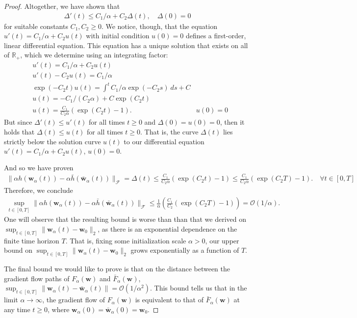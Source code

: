 \documentclass{article}
\begin{document}
\begin{proof}
Altogether, we have shown that
\begin{align*}
    \Delta'(t) \leq C_1/\alpha + C_2\Delta(t), \quad \Delta(0) = 0
\end{align*}
for suitable constants $C_1, C_2 \geq 0$. We notice, though, that the equation $u'(t) = C_1/\alpha + C_2 u(t)$ with initial condition $u(0) = 0$ defines a first-order, linear differential equation. This equation has a unique solution that exists on all of $\mathbb{R}_+$, which we determine using an integrating factor:
\begin{align*}
    &u'(t) = C_1/\alpha + C_2 u(t)\\
    &u'(t) - C_2u(t) = C_1/\alpha\\
    & \exp(-C_2t)u(t) = \int^t C_1/\alpha  \exp(-C_2s) \ ds + C\\
    & u(t) = -C_1/(C_2\alpha) + C\exp(C_2t)\\
    & u(t) = \frac{C_1}{C_2\alpha}(\exp(C_2t) - 1). & u(0) = 0
\end{align*}
But since $\Delta'(t) \leq u'(t)$ for all times $t \geq 0$ and $\Delta(0) = u(0) = 0$, then it holds that $\Delta(t) \leq u(t)$ for all times $t \geq 0$. That is, the curve $\Delta(t)$ lies strictly below the solution curve $u(t)$ to our differential equation $u'(t) = C_1/\alpha + C_2 u(t)$, $u(0) = 0$.

And so we have proven
\begin{align*}
    \| \alpha h(\boldsymbol{w}_{\alpha}(t)) - \alpha \bar{h}(\boldsymbol{\bar{w}}_{\alpha}(t)) \|_{\mathcal{F}} =  \Delta(t) \leq \frac{C_1}{C_2\alpha}(\exp(C_2t) - 1) \leq \frac{C_1}{C_2\alpha}(\exp(C_2T) - 1). \quad \forall t \in [0, T]
\end{align*}
Therefore, we conclude
\begin{align*}
   \sup_{t \in [0, T]} \| \alpha h(\boldsymbol{w}_{\alpha}(t)) - \alpha \bar{h}(\boldsymbol{\bar{w}}_{\alpha}(t)) \|_{\mathcal{F}} \leq \frac{1}{\alpha} \left( \frac{C_1}{C_2}(\exp(C_2T) - 1) \right) = \mathcal{O}(1/\alpha).
\end{align*}
One will observe that the resulting bound is worse than than that we derived on $\sup_{t \in [0, T]} \| \boldsymbol{w}_{\alpha}(t) - \boldsymbol{w}_0 \|_2$, as there is an exponential dependence on the finite time horizon $T$. That is, fixing some initialization scale $\alpha > 0$, our upper bound on $\sup_{t \in [0, T]} \| \boldsymbol{w}_{\alpha}(t) - \boldsymbol{w}_0 \|_2$ grows exponentially as a function of $T$.

The final bound we would like to prove is that on the distance between the gradient flow paths of $F_{\alpha}(\boldsymbol{w})$ and $\bar{F}_{\alpha}(\boldsymbol{w})$, $\sup_{t \in [0, T]} \| \boldsymbol{w}_{\alpha}(t) -  \boldsymbol{\bar{w}}_{\alpha}(t) \| = \mathcal{O}(1/\alpha^2)$. This bound tells us that in the limit $\alpha \rightarrow \infty$, the gradient flow of $F_{\alpha}(\boldsymbol{w})$ is equivalent to that of $\bar{F}_{\alpha}(\boldsymbol{w})$ at any time $t \geq 0$, where $\boldsymbol{w}_{\alpha}(0) = \boldsymbol{\bar{w}}_{\alpha}(0) = \boldsymbol{w}_0$. 


\end{proof}
\end{document}
